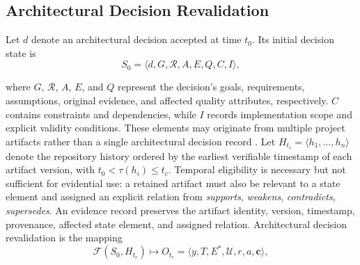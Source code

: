 \documentclass[10pt,conference]{IEEEtran}
\begin{document}
\subsection{Architectural Decision Revalidation}
\label{sec:problem-formulation}

Let $d$ denote an architectural decision accepted at time $t_0$. Its initial decision state is
\begin{equation}
S_0=\langle d,G,\mathcal{R},A,E,Q,C,I\rangle,
\label{eq:decision-state}
\end{equation}

where $G$, $\mathcal{R}$, $A$, $E$, and $Q$ represent the decision's goals, requirements, assumptions, original evidence, and affected quality attributes, respectively. $C$ contains constraints and dependencies, while $I$ records implementation scope and explicit validity conditions. These elements may originate from multiple project artifacts rather than a single architectural decision record \cite{Jansen2005Decisions,Tang2006Rationale,Borowa2023Rationales,Ahmeti2024ADRPractice,Keim2026Scattered}. Let $H_{t_c}=\langle h_1,\ldots,h_n\rangle$ denote the repository history ordered by the earliest verifiable timestamp of each artifact version, with $t_0<\tau(h_i)\leq t_c$. Temporal eligibility is necessary but not sufficient for evidential use: a retained artifact must also be relevant to a state element and assigned an explicit relation from {\emph{supports}, \emph{weakens}, \emph{contradicts}, \emph{supersedes}}. An evidence record preserves the artifact identity, version, timestamp, provenance, affected state element, and assigned relation. Architectural decision revalidation is the mapping
\begin{equation}
\mathcal{F}(S_0,H_{t_c})\mapsto
O_{t_c}=\langle y,T,E^{*},\mathcal{U},r,a,\mathbf{c}\rangle,
\label{eq:revalidation-output}
\end{equation}
\end{document}
